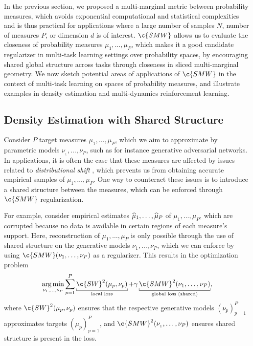\documentclass{article}
\begin{document}
In the previous section, we proposed a multi-marginal metric between probability measures, which avoids exponential computational and statistical complexities and is thus practical for applications where a large number of samples $N$, number of measures $P$, or dimension $d$ is of interest. 
$\c{SMW}$ allows us to evaluate the closeness of probability measures $\mu_1,\ldots,\mu_P$, which makes it a good candidate regularizer in multi-task learning settings over probability spaces, by encouraging shared global structure across tasks through closeness in sliced multi-marginal geometry.
We now sketch potential areas of applications of $\c{SMW}$ in the context of multi-task learning on spaces of probability measures, and illustrate examples in density estimation and multi-dynamics reinforcement learning.


\subsection{Density Estimation with Shared Structure}
\label{sec:densityestimation}

Consider $P$ target measures $\mu_1, \ldots, \mu_P$, which we aim to approximate by parametric models $\nu_{_1}, \ldots,\nu_{P}$, such as for instance generative adversarial networks.
In applications, it is often the case that these measures are affected by issues related to \emph{distributional shift} \cite{distribshift}, which prevents us from obtaining accurate empirical samples of $\mu_1,\ldots,\mu_P$.
One way to counteract these issues is to introduce a shared structure between the measures, which can be enforced through $\c{SMW}$ regularization.

For example, consider empirical estimates $\widehat{\mu}_1,\ldots,\widehat{\mu}_P$ of $\mu_1,\ldots,\mu_P$, which are corrupted because no data is available in certain regions of each measure's support.
Here, reconstruction of $\mu_1,\ldots,\mu_P$ is only possible through the use of shared structure on the generative models $\nu_{1}, \ldots,\nu_{P}$, which we can enforce by using $\c{SMW}(\nu_{1}, \ldots,\nu_{P})$ as a regularizer.
This results in the optimization problem
\[
\argmin_{\nu_1,\ldots,\nu_P} \sum_{p=1}^P \underbracket[0.1ex]{\c{SW}^2(\mu_p, \nu_p)}_{\text{local loss}} +  \gamma \underbracket[0.1ex]{\c{SMW}^2(\nu_1,\ldots,\nu_P)}_{\text{global loss (shared)}},
\label{eq:multitask}
\]
where $\c{SW}^2(\mu_p, \nu_p)$ ensures that the respective generative models $(\nu_p)_{p=1}^P$ approximates targets $(\mu_p)_{p=1}^P$, and $\c{SMW}^2(\nu_{_1}, \ldots,\nu_{P})$ ensures shared structure is present in the loss.
\end{document}

